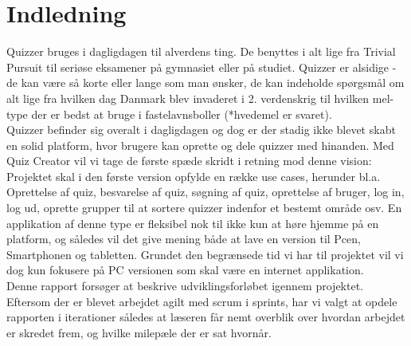 \chapter{Indledning}
Quizzer bruges i dagligdagen til alverdens ting. De benyttes i alt lige fra Trivial Pursuit til seriøse eksamener på gymnasiet eller på studiet. Quizzer er alsidige - de kan være så korte eller lange som man ønsker, de kan indeholde spørgsmål om alt lige fra hvilken dag Danmark blev invaderet i 2. verdenskrig til hvilken mel-type der er bedst at bruge i fastelavnsboller (*hvedemel er svaret). \\
Quizzer befinder sig overalt i dagligdagen og dog er der stadig ikke blevet skabt en solid platform, hvor brugere kan oprette og dele quizzer med hinanden. Med Quiz Creator vil vi tage de første spæde skridt i retning mod denne vision: Projektet skal i den første version opfylde en række use cases, herunder bl.a. Oprettelse af quiz, besvarelse af quiz, søgning af quiz, oprettelse af bruger, log in, log ud, oprette grupper til at sortere quizzer indenfor et bestemt område osv. En applikation af denne type er fleksibel nok til ikke kun at høre hjemme på en platform, og således vil det give mening både at lave en version til Pcen, Smartphonen og tabletten. Grundet den begrænsede tid vi har til projektet vil vi dog kun fokusere på PC versionen som skal være en internet applikation. \\

Denne rapport forsøger at beskrive udviklingsforløbet igennem projektet. Eftersom der er blevet arbejdet agilt med scrum i sprints, har vi valgt at opdele rapporten i iterationer således at læseren får nemt overblik over hvordan arbejdet er skredet frem, og hvilke milepæle der er sat hvornår.